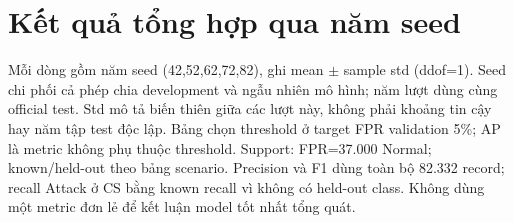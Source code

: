 \documentclass[12pt,a4paper,oneside]{report}
\begin{document}
\section{Kết quả tổng hợp qua năm seed}\label{sec:metrics}
Mỗi dòng gồm năm seed (42,52,62,72,82), ghi mean $\pm$ sample std (ddof=1). Seed chi phối cả phép chia development và ngẫu nhiên mô hình; năm lượt dùng cùng official test. Std mô tả biến thiên giữa các lượt này, không phải khoảng tin cậy hay năm tập test độc lập. Bảng chọn threshold ở target FPR validation 5\%; AP là metric không phụ thuộc threshold. Support: FPR=37.000 Normal; known/held-out theo bảng scenario. Precision và F1 dùng toàn bộ 82.332 record; recall Attack ở CS bằng known recall vì không có held-out class. Không dùng một metric đơn lẻ để kết luận model tốt nhất tổng quát.
\begingroup\fontsize{10pt}{12pt}\selectfont\setlength{\tabcolsep}{3pt}\renewcommand{\arraystretch}{1.2}
\end{document}
